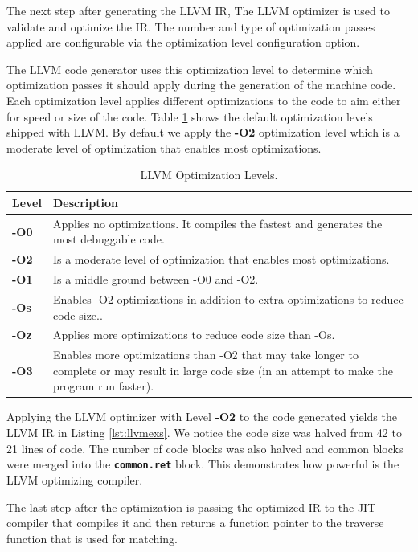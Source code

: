 The next step after generating the LLVM IR, The LLVM optimizer is used to validate and optimize the IR. The number and type of optimization passes applied are configurable via the optimization level configuration option.

The LLVM code generator uses this optimization level to determine which optimization passes it should apply during the generation of the machine code. Each optimization level applies different optimizations to the code to aim either for speed or size of the code. Table \ref{tab:optlevels} shows the default optimization levels shipped with LLVM. By default we apply the \textbf{-O2} optimization level which is a moderate level of optimization that enables most optimizations.

{\renewcommand{\arraystretch}{1.1}%
\begin{table}[H]
\centering
\small
\begin{tabularx}{\textwidth}{|l|X|}
\hline
Level        & Description  \\
\hline
\textbf{-O0} & Applies no optimizations. It compiles the fastest and generates the most debuggable code.\\
\hline
\textbf{-O2} & Is a moderate level of optimization that enables most optimizations.\\
\hline
\textbf{-O1} & Is a middle ground between -O0 and -O2.\\
\hline
\textbf{-Os} & Enables -O2 optimizations in addition to extra optimizations to reduce code size..\\
\hline
\textbf{-Oz} & Applies more optimizations to reduce code size than -Os.\\
\hline
\textbf{-O3} & Enables more optimizations than -O2 that may take longer to complete or may result in large code size (in an attempt to make the program run faster).\\
\hline
\end{tabularx}
\caption[LLVM Optimization Levels]{LLVM Optimization Levels.}\label{tab:optlevels}
\end{table}}

Applying the LLVM optimizer with Level \textbf{-O2} to the code generated yields the LLVM IR in Listing \ref{lst:llvmexs}. We notice the code size was halved from 42 to 21 lines of code. The number of code blocks was also halved and common blocks were merged into the \texttt{\textbf{common.ret}} block. This demonstrates how powerful is the LLVM optimizing compiler.

The last step after the optimization is passing the optimized IR to the JIT compiler that compiles it and
then returns a function pointer to the traverse function that is used for matching.

